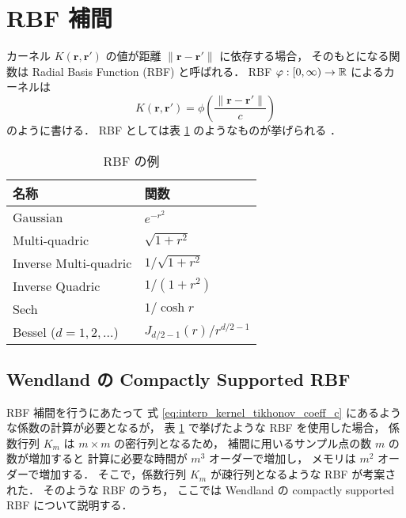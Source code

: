 %

\section{RBF 補間}\label{sec:interp_kernel_rbf}

カーネル $K(\bm{r}, \bm{r}')$ の値が距離 $\|\bm{r} - \bm{r}'\|$ に依存する場合，
そのもとになる関数は Radial Basis Function (RBF) と呼ばれる．
RBF $\varphi : [0, \infty) \to \mathbb{R}$ によるカーネルは
\begin{equation}
    K(\bm{r}, \bm{r}') = \phi\left(\frac{\|\bm{r} - \bm{r}'\|}{c}\right)
    \label{eq:regularization_kernel_kernel-of-rbf}
\end{equation}
のように書ける．
RBF としては表
\ref{table:interp_kernel_example-rbfs}
のようなものが挙げられる
\cite{Brochu2010,Fornberg2015}．

\begin{table}[bp]
    \caption{RBF の例 \cite{Brochu2010,Fornberg2015}}
    \label{table:interp_kernel_example-rbfs}
    \centering
    \begin{tabular}{ll}
        名称                      & 関数                         \\
        \hline
        Gaussian                & $e^{-r^2}$                 \\
        Multi-quadric           & $\sqrt{1 + r^2}$           \\
        Inverse Multi-quadric   & $1/\sqrt{1 + r^2}$         \\
        Inverse Quadric         & $1 / (1 + r^2)$            \\
        Sech                    & $1 / \cosh{r}$             \\
        Bessel ($d=1,2,\ldots$) & $J_{d/2-1}(r) / r^{d/2-1}$
    \end{tabular}
\end{table}

\subsection{Wendland の Compactly Supported RBF}

RBF 補間を行うにあたって
式 \eqref{eq:interp_kernel_tikhonov_coeff_c} にあるような係数の計算が必要となるが，
表 \ref{table:interp_kernel_example-rbfs}
で挙げたような RBF を使用した場合，
係数行列 $K_m$ は $m \times m$ の密行列となるため，
補間に用いるサンプル点の数 $m$ の数が増加すると
計算に必要な時間が $m^3$ オーダーで増加し，
メモリは $m^2$ オーダーで増加する．
そこで，係数行列 $K_m$ が疎行列となるような RBF が考案された．
そのような RBF のうち，
ここでは Wendland の compactly supported RBF \cite{Wendland1995} について説明する．

